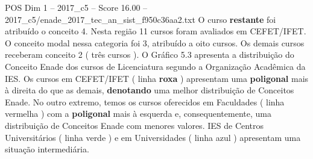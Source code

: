 \begin{textsample}{POS Dim 1 – 2017\_c5 – Score 16.00 – 2017\_c5/enade\_2017\_tec\_an\_sist\_f950c36aa2.txt}
O curso \textbf{restante} foi atribuído o conceito 4.
Nesta região 11 cursos foram avaliados em CEFET/IFET.
O conceito modal nessa categoria foi 3, atribuído a oito cursos.
Os demais cursos receberam conceito 2 ( três cursos ).
O Gráfico 5.3 apresenta a distribuição do Conceito Enade dos cursos de Licenciatura segundo a Organização Acadêmica da IES.
Os cursos em CEFET/IFET ( linha \textbf{roxa} ) apresentam uma \textbf{poligonal} mais à direita do que as demais, \textbf{denotando} uma melhor distribuição de Conceitos Enade.
No outro extremo, temos os cursos oferecidos em Faculdades ( linha vermelha ) com a \textbf{poligonal} mais à esquerda e, consequentemente, uma distribuição de Conceitos Enade com menores valores.
IES de Centros Universitários ( linha verde ) e em Universidades ( linha azul ) apresentam uma situação intermediária.

\end{textsample}
